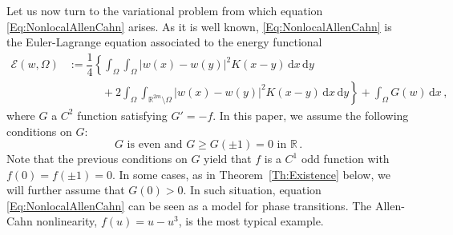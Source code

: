 \documentclass[12pt,reqno]{amsart}
\theoremstyle{definition}
\newtheorem{definition}[theorem]{Definition}
\theoremstyle{remark}
\newcommand{\con}[1]{\mathbb{#1}}
\newcommand{\R}{\con{R}} %
\newcommand{\ecal}{\mathcal{E}}
\newcommand{\lcal}{\mathcal{L}}
\newcommand{\ocal}{\mathcal{O}}
\newcommand{\s}{\gamma}
\renewcommand{\d}{\,\mathrm{d}} %
\numberwithin{equation}{section}
\begin{document}



%

Let us now turn to the variational problem from which equation \eqref{Eq:NonlocalAllenCahn} arises. As it is well known, \eqref{Eq:NonlocalAllenCahn} is the Euler-Lagrange equation associated to the energy functional
\begin{equation}
\label{Eq:Energy}
\begin{split}
\ecal(w, \Omega) &:= 
\dfrac{1}{4} \left \{ \int_\Omega \int_\Omega |w(x) - w(y)|^2 K(x-y) \d x \d y \right. \qquad \qquad \\
& \quad \quad \quad +\left. 2 \int_\Omega \int_{\R^{2m} \setminus \Omega} |w(x) - w(y)|^2 K(x-y) \d x \d y \right \} + \int_{\Omega} G(w) \d x \,,
\end{split}
\end{equation}
where $G$ a $C^2$ function satisfying $G' = -f$. In this paper, we assume the following conditions on $G$:
\begin{equation}
\label{Eq:HipothesesG}
G \textrm{ is even and } G\geq G(\pm 1 )=0 \textrm{ in } \R\,.
\end{equation}
Note that the previous conditions on $G$ yield that $f$ is a $C^1$ odd function with $f(0)=f(\pm 1)=0$. In some cases, as in Theorem~\ref{Th:Existence} below, we will further assume that $G(0)>0$. In such situation, equation \eqref{Eq:NonlocalAllenCahn} can be seen as a model for phase transitions. The Allen-Cahn nonlinearity, $f(u) = u-u^3$, is the most typical example.
\end{document}
